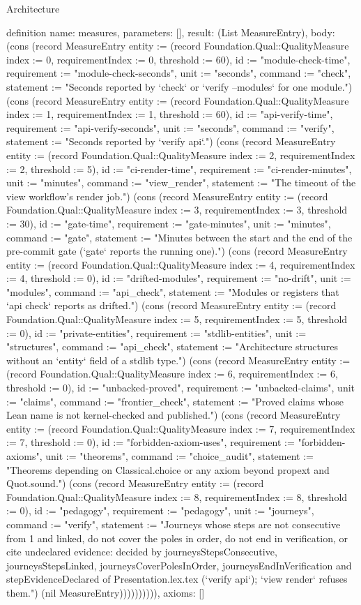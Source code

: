 \begin{lexlean}{Architecture}
\begin{semanticmodule}
definition{
  name: measures,
  parameters: [],
  result: (List MeasureEntry),
  body: (cons (record MeasureEntry {entity := (record Foundation.Qual::QualityMeasure {index := 0, requirementIndex := 0, threshold := 60}), id := "module-check-time", requirement := "module-check-seconds", unit := "seconds", command := "check", statement := "Seconds reported by `check` or `verify --modules` for one module."}) (cons (record MeasureEntry {entity := (record Foundation.Qual::QualityMeasure {index := 1, requirementIndex := 1, threshold := 60}), id := "api-verify-time", requirement := "api-verify-seconds", unit := "seconds", command := "verify", statement := "Seconds reported by `verify api`."}) (cons (record MeasureEntry {entity := (record Foundation.Qual::QualityMeasure {index := 2, requirementIndex := 2, threshold := 5}), id := "ci-render-time", requirement := "ci-render-minutes", unit := "minutes", command := "view_render", statement := "The timeout of the view workflow's render job."}) (cons (record MeasureEntry {entity := (record Foundation.Qual::QualityMeasure {index := 3, requirementIndex := 3, threshold := 30}), id := "gate-time", requirement := "gate-minutes", unit := "minutes", command := "gate", statement := "Minutes between the start and the end of the pre-commit gate (`gate` reports the running one)."}) (cons (record MeasureEntry {entity := (record Foundation.Qual::QualityMeasure {index := 4, requirementIndex := 4, threshold := 0}), id := "drifted-modules", requirement := "no-drift", unit := "modules", command := "api_check", statement := "Modules or registers that `api check` reports as drifted."}) (cons (record MeasureEntry {entity := (record Foundation.Qual::QualityMeasure {index := 5, requirementIndex := 5, threshold := 0}), id := "private-entities", requirement := "stdlib-entities", unit := "structures", command := "api_check", statement := "Architecture structures without an `entity` field of a stdlib type."}) (cons (record MeasureEntry {entity := (record Foundation.Qual::QualityMeasure {index := 6, requirementIndex := 6, threshold := 0}), id := "unbacked-proved", requirement := "unbacked-claims", unit := "claims", command := "frontier_check", statement := "Proved claims whose Lean name is not kernel-checked and published."}) (cons (record MeasureEntry {entity := (record Foundation.Qual::QualityMeasure {index := 7, requirementIndex := 7, threshold := 0}), id := "forbidden-axiom-uses", requirement := "forbidden-axioms", unit := "theorems", command := "choice_audit", statement := "Theorems depending on Classical.choice or any axiom beyond propext and Quot.sound."}) (cons (record MeasureEntry {entity := (record Foundation.Qual::QualityMeasure {index := 8, requirementIndex := 8, threshold := 0}), id := "pedagogy", requirement := "pedagogy", unit := "journeys", command := "verify", statement := "Journeys whose steps are not consecutive from 1 and linked, do not cover the poles in order, do not end in verification, or cite undeclared evidence: decided by journeysStepsConsecutive, journeysStepsLinked, journeysCoverPolesInOrder, journeysEndInVerification and stepEvidenceDeclared of Presentation.lex.tex (`verify api`); `view render` refuses them."}) (nil MeasureEntry)))))))))),
  axioms: []
}


\end{semanticmodule}
\end{lexlean}
